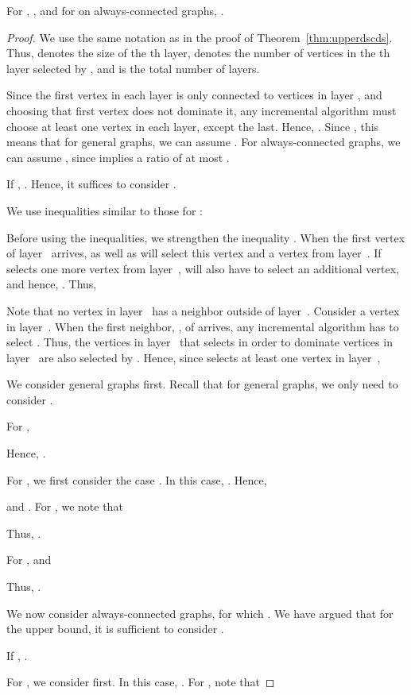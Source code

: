 \begin{theorem}
For \tds, , and for \tds on
always-connected graphs, .
\end{theorem}
\begin{proof}
We use the same notation as in the proof of
Theorem~\ref{thm:upperdscds}.
Thus,  denotes the size of the th layer,  denotes the
number of vertices in the th layer selected by ,
and  is the total number of layers.

Since the first vertex in each layer  is only connected to vertices in
layer , and choosing that first vertex does not dominate it, any 
incremental algorithm must choose at least one vertex
in each layer, except the last.
Hence, .
Since , this means that for general graphs,
we can assume .
For always-connected graphs, we can assume , since  implies a ratio of at most .

If , .
Hence, it suffices to consider .

We use inequalities similar to those for \ds:


Before using the inequalities, we strengthen the inequality .
When the first vertex of layer~ arrives, \onopt as well as
\alayersparent will select this vertex and a vertex from layer~.
If \alayersparent selects one more vertex from layer~, \onopt will
also have to select an additional vertex, and hence, .
Thus,
 
Note that no vertex in layer~ has a neighbor outside of layer~.
Consider a vertex  in layer~.
When the first neighbor, , of  arrives, any incremental
algorithm has to select .
Thus, the vertices in layer~ that \alayersparent selects in
order to dominate vertices in layer~ are also selected by \onopt.
Hence, since \onopt selects at least one vertex in layer~, 
 

We consider general graphs first.
Recall that for general graphs, we only need to consider .

For , 

Hence, 
.

For , we first consider the case .
In this case, .
Hence, 

and 
.
For , we note that 

Thus, 
.

For , 
and

Thus, .

We now consider always-connected graphs, for which .
We have argued that for the upper bound, it is sufficient to consider
. 

If , .

For , we consider  first.
In this case, .
For , note that 


\end{proof}
